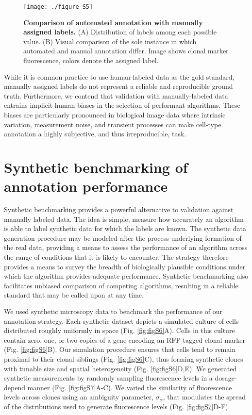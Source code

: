 \begin{figure}[h]
\texttt{[image: ./figure\_S5]}
\caption[Comparison of automated annotation with manually assigned labels.]{\textbf{Comparison of automated annotation with manually assigned labels.} (A) Distribution of labels among each possible value. (B) Visual comparison of the sole instance in which automated and manual annotation differ. Image shows clonal marker fluorescence, colors denote the assigned label.}
\label{fig:figS5}
\end{figure}

While it is common practice to use human-labeled data as the gold standard, manually assigned labels do not represent a reliable and reproducible ground truth. Furthermore, we contend that validation with manually-labeled data entrains implicit human biases in the selection of performant algorithms. These biases are particularly pronounced in biological image data where intrinsic variation, measurement noise, and transient processes can make cell-type annotation a highly subjective, and thus irreproducible, task. 


\section{Synthetic benchmarking of annotation performance}
\label{ch:benchmarking}

Synthetic benchmarking provides a powerful alternative to validation against manually labeled data. The idea is simple; measure how accurately an algorithm is able to label synthetic data for which the labels are known. The synthetic data generation procedure may be modeled after the process underlying formation of the real data, providing a means to assess the performance of an algorithm across the range of conditions that it is likely to encounter. The strategy therefore provides a means to survey the breadth of biologically plausible conditions under which the algorithm provides adequate performance. Synthetic benchmarking also facilitates unbiased comparison of competing algorithms, resulting in a reliable standard that may be called upon at any time. 

We used synthetic microscopy data to benchmark the performance of our annotation strategy. Each synthetic dataset depicts a simulated culture of cells distributed roughly uniformly in space (Fig. \ref{fig:figS6}A). Cells in this culture contain zero, one, or two copies of a gene encoding an RFP-tagged clonal marker (Fig. \ref{fig:figS6}B). Our simulation procedure ensures that cells tend to remain proximal to their clonal siblings (Fig. \ref{fig:figS6}C), thus forming synthetic clones with tunable size and spatial heterogeneity (Fig. \ref{fig:figS6}D,E). We generated synthetic measurements by randomly sampling fluorescence levels in a dosage-depend manner (Fig. \ref{fig:figS7}A-C). We varied the similarity of fluorescence levels across clones using an ambiguity parameter, $\sigma_{\alpha}$, that modulates the spread of the distributions used to generate fluorescence levels (Fig. \ref{fig:figS7}D-F). 

